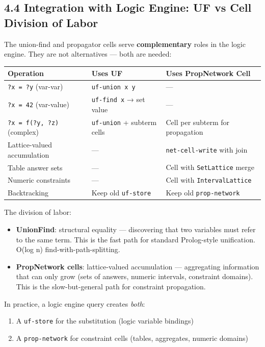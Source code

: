 \documentclass[11pt]{article}
\begin{document}
\subsection{4.4 Integration with Logic Engine: UF vs Cell Division of Labor}
\label{sec:org86765c6}

The union-find and propagator cells serve \textbf{complementary} roles in the logic
engine. They are not alternatives — both are needed:

\begin{center}
\begin{tabular}{lll}
Operation & Uses UF & Uses PropNetwork Cell\\
\hline
\texttt{?x = ?y} (var-var) & \texttt{uf-union x y} & —\\
\texttt{?x = 42} (var-value) & \texttt{uf-find x} → set value & —\\
\texttt{?x = f(?y, ?z)} (complex) & \texttt{uf-union} + subterm cells & Cell per subterm for propagation\\
Lattice-valued accumulation & — & \texttt{net-cell-write} with join\\
Table answer sets & — & Cell with \texttt{SetLattice} merge\\
Numeric constraints & — & Cell with \texttt{IntervalLattice}\\
Backtracking & Keep old \texttt{uf-store} & Keep old \texttt{prop-network}\\
\end{tabular}
\end{center}

The division of labor:
\begin{itemize}
\item \textbf{UnionFind}: structural equality — discovering that two variables must refer
to the same term. This is the fast path for standard Prolog-style unification.
O(log n) find-with-path-splitting.
\item \textbf{PropNetwork cells}: lattice-valued accumulation — aggregating information that
can only grow (sets of answers, numeric intervals, constraint domains). This is
the slow-but-general path for constraint propagation.
\end{itemize}

In practice, a logic engine query creates \emph{both}:
\begin{enumerate}
\item A \texttt{uf-store} for the substitution (logic variable bindings)
\item A \texttt{prop-network} for constraint cells (tables, aggregates, numeric domains)
\end{enumerate}
\end{document}
